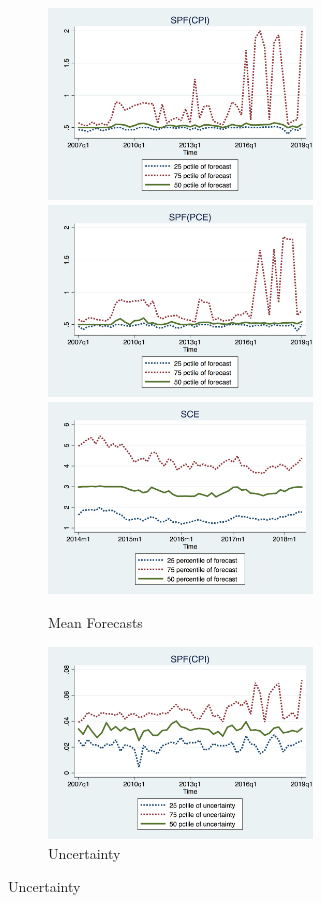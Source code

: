 \documentclass[12pt]{article}
\begin{document}
	
	\begin{figure}[ht]
		\begin{subfigure}[b]{0.5\textwidth}
		\centering
		\caption{Mean Forecasts}
		\includegraphics[width=7cm]{figures/IQRmeanCPIQ.png} 
		\smallskip
		\includegraphics[width=7cm]{figures/IQRmeanPCEQ.png}
		\smallskip
		\includegraphics[width=7cm]{figures/IQRmeanSCEM.png}
		\end{subfigure}
	    \hfill 
		\begin{subfigure}[b]{0.5\textwidth}
		\centering 
		\caption{Uncertainty}
		\includegraphics[width=7cm]{figures/IQRvarCPIQ.png}

\end{subfigure}
\end{figure}
\end{document}
